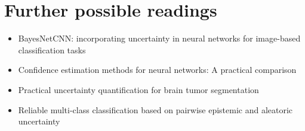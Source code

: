 \documentclass[10pt]{article}
\begin{document}
\section*{Further possible readings}
\begin{itemize}
    \item BayesNetCNN: incorporating uncertainty in neural networks for image-based classification tasks \cite{ferrante2022bayesnetcnn}
    \item Confidence estimation methods for neural networks: A practical comparison \cite{papadopoulos2001confidence}
    \item Practical uncertainty quantification for brain tumor segmentation \cite{fuchs2021practical}
    \item Reliable multi-class classification based on pairwise epistemic and aleatoric uncertainty\cite{nguyen2018reliable}
\end{itemize}


 

\end{document}
